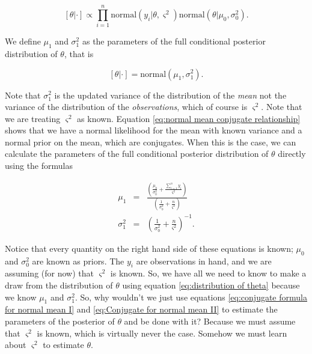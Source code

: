 \documentclass[11pt]{article}
\begin{document}
\begin{equation}
\left[\theta|\cdot\right]\propto\prod_{i=1}^{n}\text{normal}\left(y_{i}|\theta,\varsigma^{2}\right)\text{normal}\left(\theta|\mu_{0},\sigma_{0}^{2}\right).\label{eq:normal mean conjugate relationship}
\end{equation}

We define $\mu_{1}$ and $\sigma_{1}^{2}$ as the parameters of the full 
conditional posterior distribution of $\theta$, that is 

\begin{equation}
\left[\theta|\cdot\right]=\text{normal}(\mu_{1},\sigma_{1}^{2}).\label{eq:distribution of theta}
\end{equation}

Note that $\sigma_{1}^{2}$ is the updated variance of the distribution of the \emph{mean} not the variance of the distribution of the \emph{observations}, which of course is $\varsigma^{2}$. Note that we are treating $\varsigma^{2}$ as known. Equation \ref{eq:normal mean conjugate relationship} shows that we have a normal likelihood for the mean with known variance and a normal prior on the mean, which are conjugates. When this is the case, we can calculate the parameters of the full conditional posterior distribution of $\theta$ directly using the formulas

\begin{eqnarray}
\mu_{1} & = & \frac{\left(\frac{\mu_{0}}{\sigma_{0}^{2}}+\frac{\sum_{i=1}^{n}y_{i}}{\varsigma^{2}}\right)}{\left(\frac{1}{\sigma_{0}^{2}}+\frac{n}{\varsigma^{2}}\right)}\label{eq:conjugate formula for normal mean I}\\
\sigma_{1}^{2} & = & \left(\frac{1}{\sigma_{0}^{2}}+\frac{n}{\varsigma^{2}}\right)^{-1}.\label{eq:Conjugate for normal mean II}
\end{eqnarray}

Notice that every quantity on the right hand side of these equations is known; $\mu_{0}$ and $\sigma_{0}^{2}$ are known as priors. The $y_{i}$ are observations in hand, and we are assuming (for now) that $\varsigma^{2}$ is known. So, we have all we need to know to make a draw from the distribution of $\theta$ using equation \ref{eq:distribution of theta}
because we know $\mu_{1}$ and $\sigma_{1}^{2}$. So, why wouldn't we just use equations $ $\ref{eq:conjugate formula for normal mean I} and \ref{eq:Conjugate for normal mean II} to estimate the parameters of the posterior of $\theta$ and be done with it? Because we must assume that $\varsigma^{2}$ is known, which is virtually never the case. Somehow we must learn about $\varsigma^{2}$ to estimate $\theta$.
\end{document}

